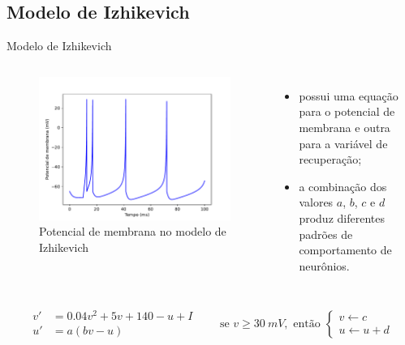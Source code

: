 \subsection{Modelo de Izhikevich}
\begin{frame}{Modelo de Izhikevich}
	\begin{columns}[t]
		\column{5cm}
			\begin{figure}[tb]
				\centering
				\caption{Potencial de membrana no modelo de Izhikevich}
				\label{fig:izhikevich}
				\includegraphics[width=0.83\linewidth]{figs/izhikevich}
			\end{figure}
		\column{5cm}
		\begin{itemize}
			\item possui uma equação para o potencial de membrana e outra para a variável de recuperação;
			\item a combinação dos valores $a$, $b$, $c$ e $d$ produz diferentes padrões de comportamento de neurônios.
		\end{itemize}
	\end{columns}
	\[
		\begin{aligned}
			v'&=0.04v^2+5v+140-u+I\\
			u'&=a(bv-u)
		\end{aligned}
		\qquad
		\text{se }v\geq30\ mV,\text{ então }\begin{cases}
			v\leftarrow c\\
			u\leftarrow u+d
		\end{cases}
	\]
\end{frame}

